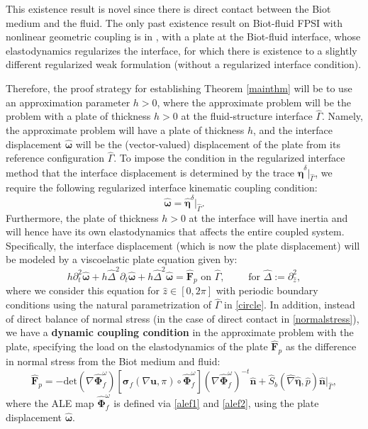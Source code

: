 \documentclass[11pt]{article}
\newcommand{\bd}{\boldsymbol}
\theoremstyle{definition}
\begin{document}
This existence result is novel since there is direct contact between the Biot medium and the fluid. The only past existence result on Biot-fluid FPSI with nonlinear geometric coupling is in \cite{NonlinearFPSI_CRM23, FPSIJMPA}, with a plate at the Biot-fluid interface, whose elastodynamics regularizes the interface, for which there is existence to a slightly different regularized weak formulation (without a regularized interface condition). 

Therefore, the proof strategy for establishing Theorem \ref{mainthm} will be to use an approximation parameter $h > 0$, where the approximate problem will be the problem with a plate of thickness $h > 0$ at the fluid-structure interface $\hat{\Gamma}$. Namely, the approximate problem will have a plate of thickness $h$, and the interface displacement $\hat{\bd{\omega}}$ will be the (vector-valued) displacement of the plate from its reference configuration $\hat{\Gamma}$. To impose the condition in the regularized interface method that the interface displacement is determined by the trace $\hat{\bd{\eta}}^{\delta}|_{\hat{\Gamma}}$, we require the following regularized interface kinematic coupling condition:
\begin{equation*}
\hat{\bd{\omega}} = \hat{\bd{\eta}}^{\delta}|_{\hat{\Gamma}}. 
\end{equation*}
Furthermore, the plate of thickness $h > 0$ at the interface will have inertia and will hence have its own elastodynamics that affects the entire coupled system. Specifically, the interface displacement (which is now the plate displacement) will be modeled by a viscoelastic plate equation given by: 
\begin{equation}\label{plate}
h \partial_{t}^{2} \hat{\bd{\omega}} + h \hat{\Delta}^{2} \partial_{t} \hat{\bd{\omega}} + h \hat{\Delta}^{2} \hat{\bd{\omega}} = \hat{\bd{F}}_{p} \text{ on } \hat{\Gamma}, \qquad \text{ for } \hat{\Delta} := \partial^{2}_{\hat{z}},
\end{equation}
where we consider this equation for $\hat{z} \in [0, 2\pi]$ with periodic boundary conditions using the natural parametrization of $\hat{\Gamma}$ in \eqref{circle}. In addition, instead of direct balance of normal stress (in the case of direct contact in \eqref{normalstress}), we have a \textbf{dynamic coupling condition} in the approximate problem with the plate, specifying the load on the elastodynamics of the plate $\hat{\bd{F}}_{p}$ as the difference in normal stress from the Biot medium and fluid:
\begin{equation}\label{traction}
\hat{\bd{F}}_{p} = -\text{det}(\nabla \hat{\bd{\Phi}}^{\omega}_{f}) [\bd{\sigma}_{f}(\nabla \bd{u}, \pi) \circ \hat{\bd{\Phi}}^{\omega}_{f}] (\nabla \hat{\bd{\Phi}}^{\omega}_{f})^{-t} \hat{\bd{n}} + \hat{S}_{b}(\hat{\nabla} \hat{\bd{\eta}}, \hat{p})\hat{\bd{n}}|_{\hat{\Gamma}},
\end{equation}
where the ALE map $\hat{\bd{\Phi}}^{\omega}_{f}$ is defined via \eqref{alef1} and \eqref{alef2}, using the plate displacement $\hat{\bd{\omega}}$. 
\end{document}
